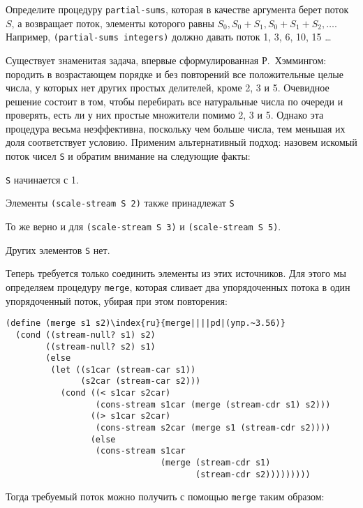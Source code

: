 \begin{exercise}{3.55}\label{EX3.55}%
Определите процедуру {\tt partial-sums},
которая
в качестве аргумента берет поток $S$, а возвращает поток,
элементы которого равны $S_0, S_0 + S_1, S_0 + S_1 + S_2,
\ldots$.  Например, {\tt (partial-sums integers)} должно
давать поток 1, 3, 6, 10, 15 \ldots
\end{exercise}
\begin{exercise}{3.56}\label{EX3.56}%
Существует знаменитая задача, впервые
сформулированная Р.~Хэммингом: породить в
возрастающем порядке и без повторений все положительные целые числа, у
которых нет других простых делителей, кроме 2, 3 и 5. Очевидное
решение состоит в том, чтобы перебирать все натуральные числа по
очереди и проверять, есть ли у них простые множители помимо 2, 3 и
5. Однако эта процедура весьма неэффективна, поскольку чем больше
числа, тем меньшая их доля соответствует условию.  Применим
альтернативный подход: назовем искомый поток чисел  {\tt S} и обратим
внимание на следующие факты:

\begin{plainlist}


\item
{\tt S} начинается с 1.

\item
Элементы {\tt (scale-stream S 2)} также
принадлежат {\tt S}

\item
То же верно и для {\tt (scale-stream S 3)}
и {\tt (scale-stream S 5)}.

\item
Других элементов {\tt S} нет.
\end{plainlist}
Теперь требуется только  соединить элементы из этих источников.  Для
этого мы определяем процедуру {\tt merge}, которая сливает два
упорядоченных потока в один упорядоченный поток, убирая при этом
повторения:

\begin{Verbatim}[fontsize=\small]
(define (merge s1 s2)\index{ru}{merge||||pd|(упр.~3.56)}
  (cond ((stream-null? s1) s2)
        ((stream-null? s2) s1)
        (else
         (let ((s1car (stream-car s1))
               (s2car (stream-car s2)))
           (cond ((< s1car s2car)
                  (cons-stream s1car (merge (stream-cdr s1) s2)))
                 ((> s1car s2car)
                  (cons-stream s2car (merge s1 (stream-cdr s2))))
                 (else
                  (cons-stream s1car
                               (merge (stream-cdr s1)
                                      (stream-cdr s2)))))))))
\end{Verbatim}
Тогда требуемый поток можно получить с помощью {\tt merge}
таким образом:


\end{exercise}
